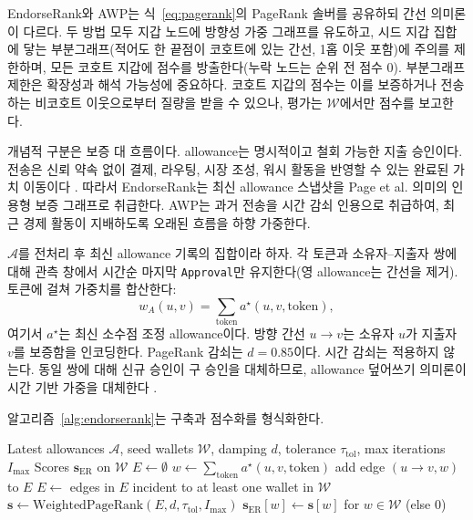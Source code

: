 
EndorseRank와 AWP는 식~\eqref{eq:pagerank}의 PageRank 솔버를 공유하되 간선 의미론이 다르다. 두 방법 모두 지갑 노드에 방향성 가중 그래프를 유도하고, 시드 지갑 집합에 닿는 부분그래프(적어도 한 끝점이 코호트에 있는 간선, 1홉 이웃 포함)에 주의를 제한하며, 모든 코호트 지갑에 점수를 방출한다(누락 노드는 순위 전 점수 $0$). 부분그래프 제한은 확장성과 해석 가능성에 중요하다. 코호트 지갑의 점수는 이를 보증하거나 전송하는 비코호트 이웃으로부터 질량을 받을 수 있으나, 평가는 $\mathcal{W}$에서만 점수를 보고한다.

개념적 구분은 보증 대 흐름이다. allowance는 명시적이고 철회 가능한 지출 승인이다. 전송은 신뢰 약속 없이 결제, 라우팅, 시장 조성, 워시 활동을 반영할 수 있는 완료된 가치 이동이다 . 따라서 EndorseRank는 최신 allowance 스냅샷을 Page et al. 의미의 인용형 보증 그래프로 취급한다. AWP는 과거 전송을 시간 감쇠 인용으로 취급하여, 최근 경제 활동이 지배하도록 오래된 흐름을 하향 가중한다.


$\mathcal{A}$를 전처리 후 최신 allowance 기록의 집합이라 하자. 각 토큰과 소유자--지출자 쌍에 대해 관측 창에서 시간순 마지막 \texttt{Approval}만 유지한다(영 allowance는 간선을 제거). 토큰에 걸쳐 가중치를 합산한다:
\begin{equation}
\label{eq:approve-weight}
w_A(u,v)
=
\sum_{\mathrm{token}}
a^{\star}(u,v,\mathrm{token}),
\end{equation}
여기서 $a^{\star}$는 최신 소수점 조정 allowance이다. 방향 간선 $u\to v$는 소유자 $u$가 지출자 $v$를 보증함을 인코딩한다. PageRank 감쇠는 $d=0.85$이다. 시간 감쇠는 적용하지 않는다. 동일 쌍에 대해 신규 승인이 구 승인을 대체하므로, allowance 덮어쓰기 의미론이 시간 기반 가중을 대체한다 .

알고리즘~\ref{alg:endorserank}는 구축과 점수화를 형식화한다.

\begin{algorithm}[htbp]
\caption{EndorseRank graph construction and scoring}
\label{alg:endorserank}
\begin{algorithmic}[1]
\Require Latest allowances $\mathcal{A}$, seed wallets $\mathcal{W}$, damping $d$, tolerance $\tau_{\mathrm{tol}}$, max iterations $I_{\max}$
\Ensure Scores $\mathbf{s}_{\mathrm{ER}}$ on $\mathcal{W}$
\State $E \gets \emptyset$
  \State $w \gets \sum_{\mathrm{token}} a^{\star}(u,v,\mathrm{token})$
    \State add edge $(u\to v, w)$ to $E$
  \EndIf
\EndFor
\State $E \gets$ edges in $E$ incident to at least one wallet in $\mathcal{W}$
\State $\mathbf{s} \gets \mathrm{WeightedPageRank}(E, d, \tau_{\mathrm{tol}}, I_{\max})$
\State \Return $\mathbf{s}_{\mathrm{ER}}[w] \gets \mathbf{s}[w]$ for $w\in\mathcal{W}$ (else $0$)
\end{algorithmic}
\end{algorithm}

